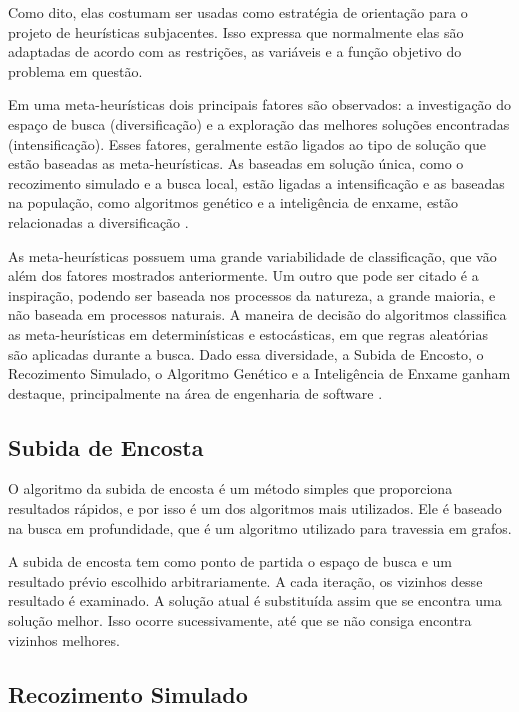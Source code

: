 Como dito, elas costumam ser usadas como estratégia de orientação para o projeto de heurísticas subjacentes. Isso expressa que normalmente elas são adaptadas de acordo com as restrições, as variáveis e a função objetivo do problema em questão. 

Em uma meta-heurísticas dois principais fatores são observados: a investigação do espaço de busca (diversificação) e a exploração das melhores soluções encontradas (intensificação). Esses fatores, geralmente estão ligados ao tipo de solução que estão baseadas as meta-heurísticas. As baseadas em solução única, como o recozimento simulado e a busca local, estão ligadas a intensificação e as baseadas na população, como algoritmos genético e a inteligência de enxame, estão relacionadas a diversificação \cite{talbi2009metaheuristics}.

As meta-heurísticas possuem uma grande variabilidade de classificação, que vão além dos fatores mostrados anteriormente. Um outro que pode ser citado é a inspiração, podendo ser baseada nos processos da natureza, a grande maioria, e não baseada em processos naturais. A maneira de decisão do algoritmos classifica as meta-heurísticas em determinísticas e estocásticas, em que regras aleatórias são aplicadas durante a busca. Dado essa diversidade, a Subida de Encosto, o Recozimento Simulado, o Algoritmo Genético e a Inteligência de Enxame ganham destaque, principalmente na área de engenharia de software \cite{khari2017extensive}.

\subsection{Subida de Encosta}

O algoritmo da subida de encosta é um método simples que proporciona resultados rápidos, e por isso é um dos algoritmos mais utilizados. Ele é baseado na busca em profundidade, que é um algoritmo utilizado para travessia em grafos. 

A subida de encosta tem como ponto de partida o espaço de busca e um resultado prévio escolhido arbitrariamente. A cada iteração, os vizinhos desse resultado é examinado. A solução atual é substituída assim que se encontra uma solução melhor. Isso ocorre sucessivamente, até que se não consiga encontra vizinhos melhores.  

\subsection{Recozimento Simulado}

